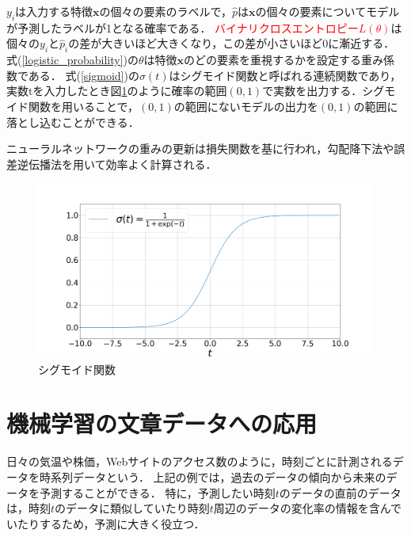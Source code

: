 \documentclass[12pt,a4j]{jreport}
\begin{document}
$y_{i}$は入力する特徴$\mathbf{x}$の個々の要素のラベルで，$\hat{p}$は$\mathbf{x}$の個々の要素についてモデルが予測したラベルが1となる確率である．
\textcolor{red}{バイナリクロスエントロピー$L(\theta)$}は個々の$y_{i}$と$\hat{p}_{i}$の差が大きいほど大きくなり，この差が小さいほど0に漸近する．
式(\ref{logistic_probability})の$\theta$は特徴$\mathbf{x}$のどの要素を重視するかを設定する重み係数である．
式(\ref{sigmoid})の$\sigma(t)$はシグモイド関数と呼ばれる連続関数であり，実数tを入力したとき図\ref{fig_sigmoid}のように確率の範囲$(0, 1)$で実数を出力する．シグモイド関数を用いることで，$(0, 1)$の範囲にないモデルの出力を$(0, 1)$の範囲に落とし込むことができる．

ニューラルネットワークの重みの更新は損失関数を基に行われ，勾配降下法や誤差逆伝播法を用いて効率よく計算される．

\begin{figure}[H]
  \centering
  \includegraphics[keepaspectratio, width=120mm]{img/sigmoid.png}
  \caption{シグモイド関数}
  \label{fig_sigmoid}
\end{figure}





\section{機械学習の文章データへの応用}
\label{apply_for_time_series_data}
日々の気温や株価，Webサイトのアクセス数のように，時刻ごとに計測されるデータを時系列データという\cite{aurellen20}．
上記の例では，過去のデータの傾向から未来のデータを予測することができる．
特に，予測したい時刻$t$のデータの直前のデータは，時刻$t$のデータに類似していたり時刻$t$周辺のデータの変化率の情報を含んでいたりするため，予測に大きく役立つ．
\end{document}

